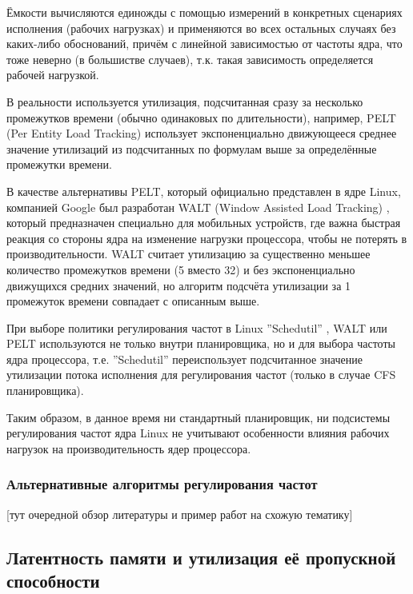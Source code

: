     Ёмкости вычисляются единожды с помощью измерений в конкретных сценариях исполнения
    (рабочих нагрузках) и применяются во всех остальных случаях без каких-либо обоснований, причём
    с линейной зависимостью от частоты ядра, что тоже неверно (в большистве случаев), т.к.
    такая зависимость определяется рабочей нагрузкой.

    В реальности используется утилизация, подсчитанная сразу за несколько промежутков времени
    (обычно одинаковых по длительности), например, PELT (Per Entity Load Tracking)
    \cite{KernelDocsSchedutil} использует экспоненциально движующееся
    среднее значение утилизаций из подсчитанных по формулам выше за определённые промежутки времени.

    В качестве альтернативы PELT, который официально представлен в ядре Linux, компанией Google
    был разработан WALT (Window Assisted Load Tracking) \cite{QualcommWALT}, который предназначен
    специально для мобильных устройств, где важна быстрая реакция со стороны ядра на изменение
    нагрузки процессора, чтобы не потерять в производительности.
    WALT считает утилизацию за существенно меньшее количество промежутков времени (5 вместо 32) и без
    экспоненциально движущихся средних значений, но алгоритм подсчёта утилизации за 1 промежуток времени
    совпадает с описанным выше.

    При выборе политики регулирования частот в Linux ''Schedutil'' \cite{KernelDocsSchedutil},
    WALT или PELT используются не только внутри планировщика, но и для выбора частоты ядра процессора, т.е.
    ''Schedutil'' переиспользует подсчитанное значение утилизации потока исполнения для регулирования
    частот (только в случае CFS планировщика).

    Таким образом, в данное время ни стандартный планировщик, ни подсистемы регулирования частот
    ядра Linux не учитывают особенности влияния рабочих нагрузок на производительность
    ядер процессора.

\subsubsection{Альтернативные алгоритмы регулирования частот}

    [тут очередной обзор литературы и пример работ на схожую тематику]



\subsection{Латентность памяти и утилизация её пропускной способности} \label{lat_util_chapter}

